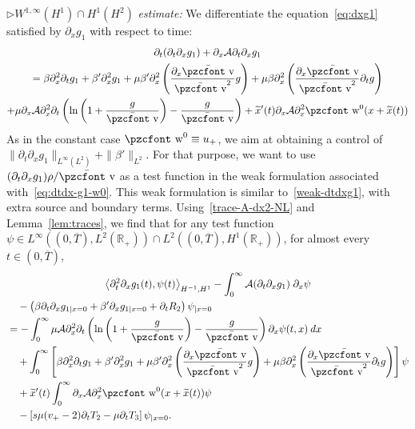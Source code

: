 \documentclass[10pt]{amsart}
\theoremstyle{definition}\newtheorem{defi}[theo]{Definition}\newtheorem{rema}[theo]{Remark}\newtheorem{exam}[theo]{Example}\newtheorem{exem}[theo]{Example}\newtheorem{nota}[theo]{Notation}
\newcommand{\mathpzc}[1]{\text{\pzcfont #1}}
\newcommand{\R}{\mathbb{R}}
\newcommand{\p}{\partial}
\newcommand{\bv}{\bar{\mathpzc{v}}}
\newcommand{\cA}{\mathcal A}
\newcommand{\tw}{\mathpzc{w}}
\newcommand{\tx}{\widetilde{x}}
\begin{document}
$\rhd W^{1,\infty}(H^1)\cap H^1(H^2)$ \emph{estimate:} We differentiate the equation~\eqref{eq:dxg1} satisfied by $\partial_x g_1$ with respect to time:
\begin{multline}\label{eq:dtdx-g1-w0}
\partial_t (\partial_t \partial_x g_1) + \partial_x \cA \partial_t \partial_x g_1 \\
= \beta \partial^2_x \partial_t g_1 + \beta'\partial^2_x g_1 + \mu \beta' \partial^2_x \left(\dfrac{\partial_x \bv}{\bv^2} g\right) + \mu \beta \partial^2_x \left(\dfrac{\partial_x \bv}{\bv^2} \partial_t g\right) \\
 + \mu \partial_x \cA \partial_x^2 \partial_t \left(\ln \left(1+ \dfrac{g}{\bv}\right) - \dfrac{g}{\bv} \right) + \tx'(t) \partial_x \cA \partial^2_x \tw^0(x + \tx(t))
\end{multline}
As in the constant case $\tw^0 \equiv u_+$, we aim at obtaining a control of $\|\partial_t \partial_x g_1\|_{L^\infty(L^2)} + \|\beta'\|_{L^2}$. For that purpose, we want to use $(\partial_t \partial_x g_1) \rho/\bv$ as a test function in the weak formulation associated with~\eqref{eq:dtdx-g1-w0}. This weak formulation is similar to~\eqref{weak-dtdxg1}, with extra source and boundary terms. Using~\eqref{trace-A-dx2-NL} and Lemma~\ref{lem:traces}, we find that for any test function $\psi\in L^\infty((0,\overline{T}), L^2(\R_+))\cap L^2((0,\overline{T}), H^1(\R_+))$, for almost every $t\in (0,\overline{T})$,
\begin{multline*}
\left\langle \p_t^2 \p_x g_1(t), \psi(t)\right\rangle_{H^{-1}, H^1} -\int_0^\infty \cA(\p_t\p_x g_1)\; \p_x \psi
\\
\begin{aligned}
&\quad -\left(\beta\p_t\p_x g_{1|x=0} + \beta' \p_xg_{1|x=0} + \p_t R_2\right)\psi_{|x=0}\\
&=-\int_0^\infty \mu \cA \p_x^2 \p_t \left(\ln \left(1+ \dfrac{g}{\bv}\right) - \dfrac{g}{\bv} \right) \p_x \psi(t,x)\:dx \\
&\quad +\int_0^\infty \left[\beta \p_x^2\p_t g_1 + \beta'\partial^2_x g_1 + \mu \beta' \partial^2_x \left(\dfrac{\partial_x \bv}{\bv^2} g\right) + \mu \beta \partial^2_x \left(\dfrac{\partial_x \bv}{\bv^2} \partial_t g\right) \right] \psi\\
&\quad + \tx'(t) \int_0^\infty\partial_x \cA \partial^2_x \tw^0(x + \tx(t)) \psi\\
&\quad -\left[s\mu (v_+-2)\p_t T_2 - \mu \p_t T_3\right] \psi_{|x=0}.
\end{aligned}
\end{multline*}
\end{document}
